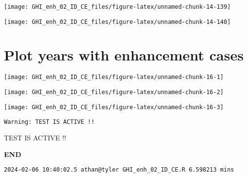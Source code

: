 \documentclass[
  10pt,
  a4paper,oneside]{article}
\begin{document}
\begin{center}\texttt{[image: GHI\_enh\_02\_ID\_CE\_files/figure-latex/unnamed-chunk-14-139]} \end{center}

\begin{center}\texttt{[image: GHI\_enh\_02\_ID\_CE\_files/figure-latex/unnamed-chunk-14-140]} \end{center}

\newpage
\FloatBarrier

\hypertarget{plot-years-with-enhancement-cases}{%
\section{Plot years with enhancement cases}\label{plot-years-with-enhancement-cases}}

\begin{center}\texttt{[image: GHI\_enh\_02\_ID\_CE\_files/figure-latex/unnamed-chunk-16-1]} \end{center}

\begin{center}\texttt{[image: GHI\_enh\_02\_ID\_CE\_files/figure-latex/unnamed-chunk-16-2]} \end{center}

\begin{center}\texttt{[image: GHI\_enh\_02\_ID\_CE\_files/figure-latex/unnamed-chunk-16-3]} \end{center}

\begin{verbatim}
Warning: TEST IS ACTIVE !!
\end{verbatim}

TEST IS ACTIVE !!

\textbf{END}

\begin{verbatim}
2024-02-06 10:40:02.5 athan@tyler GHI_enh_02_ID_CE.R 6.598213 mins
\end{verbatim}
\end{document}
